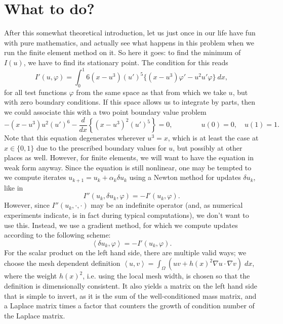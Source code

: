 \documentclass{article}
\begin{document}
\section{What to do?}

After this somewhat theoretical introduction, let us just once in our life
have fun with pure mathematics, and actually see what happens in this problem
when we run the finite element method on it. So here it goes: to find the
minimum of $I(u)$, we have to find its stationary point. The condition for
this reads
\begin{equation*}
  I'(u,\varphi) 
  = 
  \int_0^1 6 (x-u^3) (u')^5 \{ (x-u^3)\varphi' - u^2 u' \varphi\}\ dx,
\end{equation*}
for all test functions $\varphi$ from the same space as that from which we
take $u$, but with zero boundary conditions. If this space allows us to
integrate by parts, then we could associate this with a two point boundary
value problem
\begin{equation}
  \label{eq:equation}
  -(x-u^3) u^2(u')^6
  - \frac{d}{dx} \left\{(x-u^3)^2 (u')^5\right\} = 0,
  \qquad\qquad u(0)=0,
  \quad u(1)=1.
\end{equation}
Note that this equation degenerates wherever $u^3=x$, which is at least the
case at $x\in\{0,1\}$ due to the prescribed boundary values for $u$, but
possibly at other places as well.  However, for finite elements, we will want
to have the equation in weak form anyway.  Since the equation is still
nonlinear, one may be tempted to we compute iterates
$u_{k+1}=u_k+\alpha_k\delta u_k$ using a Newton method for updates $\delta
u_k$, like in
\begin{equation*}
  I''(u_k,\delta u_k,\varphi) 
  = 
  -I'(u_k, \varphi).
\end{equation*}
However, since $I''(u_k,\cdot,\cdot)$ may be an indefinite operator (and, as
numerical experiments indicate, is in fact during typical computations), we
don't want to use this. Instead, we use a gradient method, for which we
compute updates according to the following scheme:
\begin{equation}
  \left<\delta u_k,\varphi\right>
  = 
  -I'(u_k, \varphi).
\end{equation}
For the scalar product on the left hand side, there are multiple valid ways;
we choose the mesh dependent definition $\left<u,v\right> = \int_\Omega (uv +
h(x)^2 \nabla u\cdot \nabla v)\; dx$, where the weight $h(x)^2$, i.e. using
the local mesh width, is chosen so that the definition is dimensionally
consistent. It also yields a matrix on the left hand side that is simple to
invert, as it is the sum of the well-conditioned mass matrix, and a Laplace
matrix times a factor that counters the growth of condition number of the
Laplace matrix.
\end{document}
